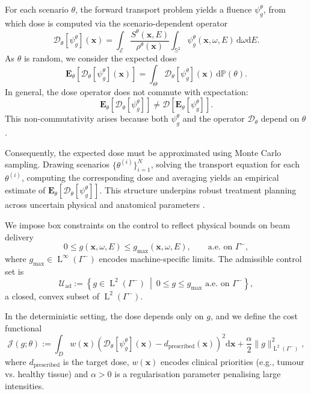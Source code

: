 \documentclass{amsart}
\newcommand{\dd}{{\mathrm d}}
\theoremstyle{plain}
\renewcommand{\vec}[1]{\ensuremath{\boldsymbol{#1}}}
\newcommand{\leb}{\text{Leb}}
\newcommand{\LL}{\ensuremath{\operatorname L}\xspace}
\renewcommand{\leb}[1]{\ensuremath{\LL^{#1}}}
\begin{document}
For each scenario $\theta$, the forward transport problem yields a
fluence $\psi_g^\theta$, from which dose is computed via the
scenario-dependent operator
\begin{equation}
  \mathcal{D}_\theta[\psi_g^\theta](\vec{x}) =
  \int_{\mathcal{E}} \frac{S^\theta(\vec{x}, E)}{\rho^\theta(\vec{x})}
  \int_{\mathbb{S}^2} \psi_g^\theta(\vec{x}, \omega, E) \, \dd \omega \dd E.
\end{equation}
As $\theta$ is random, we consider the expected dose
\begin{equation}
  \mathbf{E}_\theta\left[ \mathcal{D}_\theta[\psi_g^\theta](\vec{x}) \right] =
  \int_\Theta \mathcal{D}_\theta[\psi_g^\theta](\vec{x}) \, \mathrm{d}\mathbb{P}(\theta).
\end{equation}
In general, the dose operator does not commute with expectation:
\begin{equation}
  \mathbf{E}_\theta\left[ \mathcal{D}_\theta[\psi_g^\theta] \right]
  \neq \mathcal{D} \left[ \mathbf{E}_\theta[\psi_g^\theta] \right].
\end{equation}
This non-commutativity arises because both $\psi_g^\theta$ and the
operator $\mathcal{D}_\theta$ depend on $\theta$.

Consequently, the expected dose must be approximated using Monte Carlo
sampling. Drawing scenarios $\{\theta^{(i)}\}_{i=1}^N$, solving the
transport equation for each $\theta^{(i)}$, computing the
corresponding dose and averaging yields an empirical estimate of
$\mathbf{E}_\theta[\mathcal{D}_\theta[\psi_g^\theta]]$. This structure
underpins robust treatment planning across uncertain physical and
anatomical parameters \cite{georgiou2025scotty}.

We impose box constraints on the control to reflect physical bounds on
beam delivery
\begin{equation}
  0 \leq g(\vec{x}, \omega, E) \leq g_{\max}(\vec{x}, \omega, E), \qquad \text{a.e. on } \Gamma^-,
\end{equation}
where $g_{\max} \in \leb{\infty}(\Gamma^-)$ encodes machine-specific
limits. The admissible control set is
\begin{equation}
  \mathcal{U}_{\mathrm{ad}} :=
  \left\{ g \in \leb{2}(\Gamma^-) ~\middle|~ 0 \leq g \leq g_{\max} \text{ a.e. on } \Gamma^- \right\},
\end{equation}
a closed, convex subset of $\leb{2}(\Gamma^-)$.

In the deterministic setting, the dose depends only on $g$, and we
define the cost functional
\begin{equation}
  \label{eq:cost}
  \mathcal{J}(g; \theta) :=
  \int_D w(\vec{x}) \left( \mathcal{D}_\theta[\psi_g^\theta](\vec{x}) - d_{\text{prescribed}}(\vec{x}) \right)^2 \dd \vec{x}
  + \frac{\alpha}{2} \| g \|^2_{\leb{2}(\Gamma^-)},
\end{equation}
where $d_{\text{prescribed}}$ is the target dose, $w(\vec{x})$ encodes
clinical priorities (e.g., tumour vs. healthy tissue) and $\alpha > 0$
is a regularisation parameter penalising large intensities.
\end{document}
